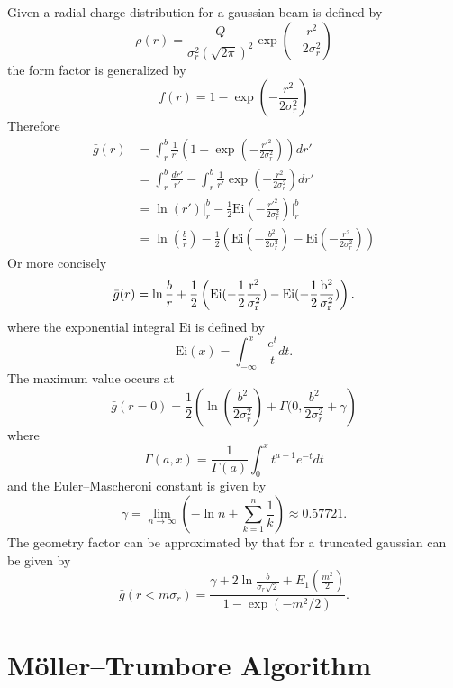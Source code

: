 Given a radial charge distribution for a gaussian beam is defined by
$$\rho(r) = \frac{Q}{\sigma_r^2(\sqrt{2\pi})^2}\exp\left(-\frac{r^2}{2\sigma_r^2}\right)$$
the form factor is generalized by
$$f(r) = 1-\exp\left(-\frac{r^2}{2\sigma_r^2}\right)$$
Therefore
$$\begin{aligned}
        \bar{g}(r) & = \int_r^b\frac{1}{r'}\left(1-\exp\left(-\frac{r'^2}{2\sigma_r^2}\right)\right)dr'                                            \\
             & =\int_r^b\frac{dr'}{r'} -\int_r^b\frac{1}{r'}\exp\left(-\frac{r^2}{2\sigma_r^2}\right)dr'                                     \\
             & = \ln(r')\Big|_r^b -\frac{1}{2}\text{Ei}\left(-\frac{r'^2}{2\sigma_r^2}\right)\Big|_r^b                                       \\
             & = \ln\left(\frac{b}{r}\right)-\frac{1}{2}\left(\text{Ei}(-\frac{b^2}{2\sigma_r^2})-\text{Ei}(-\frac{r^2}{2\sigma_r^2})\right)
    \end{aligned}$$
Or more concisely
\begin{equation}
    \bar{g}(r) = \ln\frac{b}{r} + \frac{1}{2}\left(\rm{Ei}(-\frac{1}{2}\frac{r^2}{\sigma_r^2})-\rm{Ei}(-\frac{1}{2}\frac{b^2}{\sigma_r^2})\right)
    \label{eq:g_gaussian}.
\end{equation}
where the exponential integral $\text{Ei}$ is defined by \cite{abramowitz_handbook_2013} %
$$\text{Ei}(x) = \int_{-\infty}^x \frac{e^t}{t}dt.$$
The maximum value occurs at
$$\bar{g}(r=0) = \frac{1}{2}\left(\ln\left(\frac{b^2}{2\sigma_r^2}\right)+\Gamma(0, \frac{b^2}{2\sigma_r^2}+\gamma\right)$$
where $$\Gamma(a, x) = \frac{1}{\Gamma(a)}\int_0^xt^{a-1}e^{-t}dt$$
and the Euler–Mascheroni constant is given by
$$\gamma = \lim_{n\to\infty}\left(-\ln n +\sum_{k=1}^n\frac{1}{k}\right) \approx 0.57721.$$
The geometry factor can be approximated by that for a truncated gaussian can be given by \cite{ng_space-charge_2004,ng_physics_2006}
$$\bar{g}(r<m\sigma_r) = \frac{\gamma+2\ln\frac{b}{\sigma_r\sqrt{2}}+E_1(\frac{m^2}{2})}{1-\exp(-m^2/2)}.$$

\chapter{Möller–Trumbore Algorithm}

